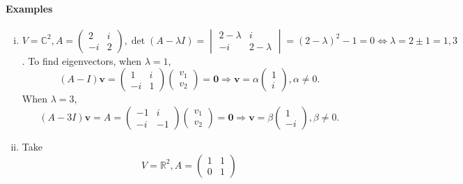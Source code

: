 \documentclass[a4paper]{article}
\begin{document}
    \paragraph{Examples}
    \begin{example}\label{eg:25.1.2}
      \begin{enumerate}[(i)]
        \item $V=\mathbb{C}^{2}, A=
          \begin{pmatrix}
            2&i\\-i&2
          \end{pmatrix}, \det (A-\lambda I)=
          \begin{vmatrix}
            2-\lambda & i\\-i & 2-\lambda
          \end{vmatrix}=(2-\lambda)^2-1=0 \Leftrightarrow
          \lambda=2\pm 1=1,3 $. To find eigenvectors, when $ \lambda=1 $,
          \[
            (A-I)\mathbf{v}=
            \begin{pmatrix}
              1&i\\-i&1
            \end{pmatrix}
            \begin{pmatrix}
              v_1\\v_2
            \end{pmatrix}=\mathbf{0} \Longrightarrow \mathbf{v}=\alpha
            \begin{pmatrix}
              1\\i
            \end{pmatrix},\alpha\neq 0
          .\]
          When $ \lambda=3 $,
          \[
            (A-3I)\mathbf{v}=A=
            \begin{pmatrix}
              -1&i\\-i&-1
            \end{pmatrix}
            \begin{pmatrix}
              v_1\\v_2
            \end{pmatrix}=\mathbf{0} \Longrightarrow
            \mathbf{v}=\beta
            \begin{pmatrix}
              1\\-i
            \end{pmatrix},\beta\neq 0
          .\]
        \item Take
          \[
            V=\mathbb{R}^{2},A=
            \begin{pmatrix}
              1&1\\0&1

\end{pmatrix}\]
\end{enumerate}
\end{example}
\end{document}

